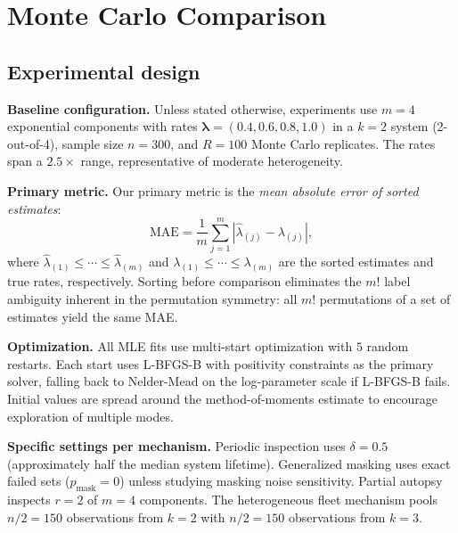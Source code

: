 \documentclass[12pt]{article}
\newcommand{\MAE}{\mathrm{MAE}}
\newcommand{\blambda}{\boldsymbol{\lambda}}
\begin{document}

\section{Monte Carlo Comparison}\label{sec:monte-carlo}

\subsection{Experimental design}\label{sec:design}

\textbf{Baseline configuration.}
Unless stated otherwise, experiments use $m = 4$ exponential components
with rates $\blambda = (0.4, 0.6, 0.8, 1.0)$ in a $k = 2$ system
(2-out-of-4), sample size $n = 300$, and $R = 100$ Monte Carlo replicates.
The rates span a $2.5\times$ range, representative of moderate
heterogeneity.

\textbf{Primary metric.}
Our primary metric is the \emph{mean absolute error of sorted estimates}:
\begin{equation}\label{eq:mae}
  \MAE = \frac{1}{m} \sum_{j=1}^{m}
    |\hat{\lambda}_{(j)} - \lambda_{(j)}|,
\end{equation}
where $\hat{\lambda}_{(1)} \leq \cdots \leq \hat{\lambda}_{(m)}$ and
$\lambda_{(1)} \leq \cdots \leq \lambda_{(m)}$ are the sorted estimates
and true rates, respectively.  Sorting before comparison eliminates the
$m!$ label ambiguity inherent in the permutation symmetry: all $m!$
permutations of a set of estimates yield the same MAE.

\textbf{Optimization.}
All MLE fits use multi-start optimization with $5$ random restarts.
Each start uses L-BFGS-B with positivity constraints as the primary
solver, falling back to Nelder-Mead on the log-parameter scale if
L-BFGS-B fails.  Initial values are spread around the method-of-moments
estimate to encourage exploration of multiple modes.

\textbf{Specific settings per mechanism.}
Periodic inspection uses $\delta = 0.5$ (approximately half the median
system lifetime).  Generalized masking uses exact failed sets
($p_{\text{mask}} = 0$) unless studying masking noise sensitivity.
Partial autopsy inspects $r = 2$ of $m = 4$ components.  The
heterogeneous fleet mechanism pools $n/2 = 150$ observations from $k = 2$
with $n/2 = 150$ observations from $k = 3$.
\end{document}
